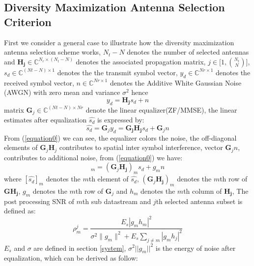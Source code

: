 \documentclass[12pt,a4paper,final]{article}
\begin{document}
\begin{spacing}{2.5}
\section{Diversity Maximization Antenna Selection Criterion}\label{channel partition}
First we consider a general case to illustrate how the diversity maximization antenna selection scheme works,
$N_{t}-N$ denotes the number of selected antennas and $\mathbf{H_{j}}\in \mathbb{C}^{N_{r}\times (N_{t}-N)}$ denotes the associated propagation matrix, $j\in {\displaystyle\biggl[1,{N_{t}\choose N}\biggr]}$, $s_{d}\in \mathbb{C}^{(Nt-N)\times 1}$ denotes the the transmit symbol vector, $y_{d}\in \mathbb{C}^{Nr\times 1}$ denotes the received symbol vector, $n\in \mathbb{C}^{Nr\times 1}$ denotes the Additive White Gaussian Noise (AWGN) with zero mean and variance $\sigma^{2}$ hence
\begin{equation}
y_{d}=\mathbf{H_{j}}s_{d}+n
\end{equation}
matrix $\mathbf{G}_{j}\in \mathbb{C}^{(Nt-N)\times Nr}$ denote the linear equalizer(ZF/MMSE), the linear estimates after equalization $\hat{s_{d}}$ is expressed by:
\begin{equation}
\hat{s_{d}}=\mathbf{G}_{j}y_{d}=\mathbf{G_{j}H_{j}}s_{d}+\mathbf{G}_{j}n\label{equation0}
\end{equation}
From (\ref{equation0}) we can see, the equalizer colors the noise, the off-diagonal elements of $\mathbf{G}_{j}\mathbf{H}_{j}$ contributes to spatial inter symbol interference, vector $\mathbf{G}_{j}n$, contributes to additional noise, from (\ref{equation0}) we have:
\begin{equation}
[\hat{s_{d}}]_{m}=(\mathbf{G}_{j}\mathbf{H_{j}})_{m}s_{d}+g_{m}n\label{equation01}
\end{equation}
where $[\hat{s_{d}}]_{m}$ denotes the $m$th element of $\hat{s_{d}}$, $(\mathbf{G}_{j}\mathbf{H_{j}})_{m}$ denotes the $m$th row of $\mathbf{GH_{j}}$, $g_{m}$ denotes the $m$th row of $\mathbf{G}_{j}$ and $h_{m}$ denotes the $m$th column of $\mathbf{H_{j}}$, The post processing SNR of $m$th sub datastream and $j$th selected antenna subset is defined as\cite{3}:
\begin{equation}
\rho^{j}_{m}=\frac{E_{s}|g_{m}h_{m}|^{2}}{\sigma^{2}\parallel g_{m}\parallel^{2}+E_{s}\sum_{j\neq m}|g_{m}h_{j}|^{2}}
\end{equation}
$E_{s}$ and $\sigma$ are defined in section \ref{system}, $\sigma^{2}||g_{m}||^{2}$ is the energy of noise after equalization, which can be derived as follow:
\begin{equation}

\end{equation}
\end{spacing}
\end{document}
